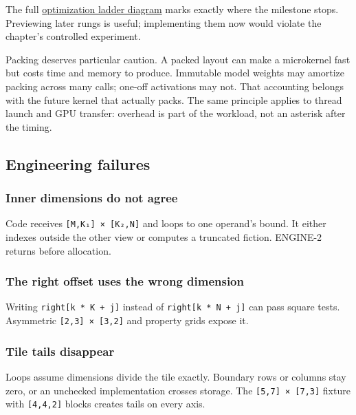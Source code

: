 \documentclass[
  10pt,
]{article}
\begin{document}
The full
\href{https://github.com/hermonai/inside-the-llm-engine/blob/astra-visual-rewrite/diagrams/linear/optimization-ladder.txt}{optimization
ladder diagram} marks exactly where the milestone stops. Previewing
later rungs is useful; implementing them now would violate the chapter's
controlled experiment.

Packing deserves particular caution. A packed layout can make a
microkernel fast but costs time and memory to produce. Immutable model
weights may amortize packing across many calls; one-off activations may
not. That accounting belongs with the future kernel that actually packs.
The same principle applies to thread launch and GPU transfer: overhead
is part of the workload, not an asterisk after the timing.

\subsection{Engineering failures}\label{engineering-failures}

\subsubsection{Inner dimensions do not
agree}\label{inner-dimensions-do-not-agree}

Code receives \texttt{{[}M,K₁{]}\ ×\ {[}K₂,N{]}} and loops to one
operand's bound. It either indexes outside the other view or computes a
truncated fiction. ENGINE-2 returns
\texttt{} before allocation.

\subsubsection{The right offset uses the wrong
dimension}\label{the-right-offset-uses-the-wrong-dimension}

Writing \texttt{right{[}k\ *\ K\ +\ j{]}} instead of
\texttt{right{[}k\ *\ N\ +\ j{]}} can pass square tests. Asymmetric
\texttt{{[}2,3{]}\ ×\ {[}3,2{]}} and property grids expose it.

\subsubsection{Tile tails disappear}\label{tile-tails-disappear}

Loops assume dimensions divide the tile exactly. Boundary rows or
columns stay zero, or an unchecked implementation crosses storage. The
\texttt{{[}5,7{]}\ ×\ {[}7,3{]}} fixture with \texttt{{[}4,4,2{]}}
blocks creates tails on every axis.
\end{document}
